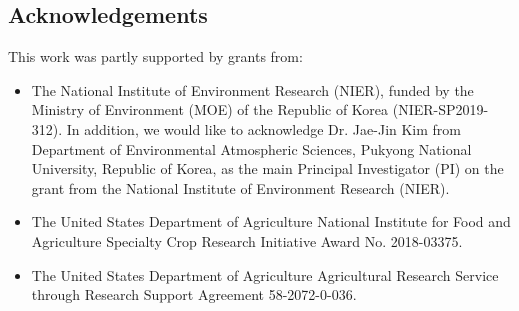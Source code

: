 \subsection{Acknowledgements}

This work was partly supported by grants from:

\begin{itemize}

\item The National Institute of Environment Research (NIER), funded by the Ministry of Environment (MOE) of the Republic of Korea (NIER-SP2019-312). In addition, we would like to acknowledge Dr. Jae-Jin Kim from Department of Environmental Atmospheric Sciences, Pukyong National University, Republic of Korea, as the main Principal Investigator (PI) on the grant from the National Institute of Environment Research (NIER).

\item The United States Department of Agriculture National Institute for Food and Agriculture Specialty Crop Research Initiative Award No. 2018-03375.

\item The United States Department of Agriculture Agricultural Research Service through Research Support Agreement 58-2072-0-036.

\end{itemize}
